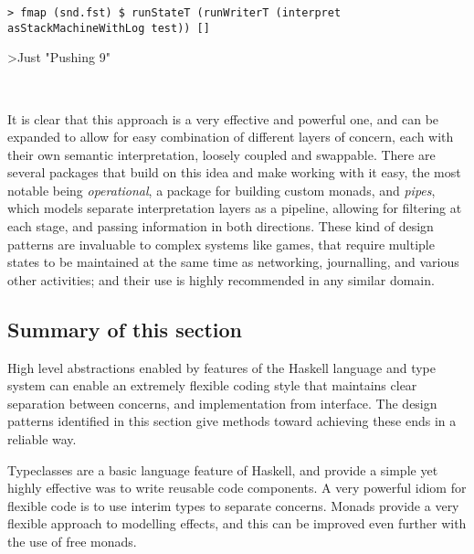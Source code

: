 \begin{verbatim}
> fmap (snd.fst) $ runStateT (runWriterT (interpret asStackMachineWithLog test)) []
\end{verbatim}\vspace{-1em}
>Just "Pushing 9\nMultiplying\nDuplicating\nMultiplying{}\nSubtracting\n"

\ 

\noindent
It is clear that this approach is a very effective and powerful one, and can be expanded to allow for easy combination of different layers of concern, each with their own semantic interpretation, loosely coupled and swappable. There are several packages that build on this idea and make working with it easy, the most notable being \emph{operational}, a package for building custom monads, and \emph{pipes}, which models separate interpretation layers as a pipeline, allowing for filtering at each stage, and passing information in both directions. These kind of design patterns are invaluable to complex systems like games, that require multiple states to be maintained at the same time as networking, journalling, and various other activities; and their use is highly recommended in any similar domain.

\subsection{Summary of this section} 

High level abstractions enabled by features of the Haskell language and type system can enable an extremely flexible coding style that maintains clear separation between concerns, and implementation from interface. The design patterns identified in this section give methods toward achieving these ends in a reliable way.

Typeclasses are a basic language feature of Haskell, and provide a simple yet highly effective was to write reusable code components. A very powerful idiom for flexible code is to use interim types to separate concerns. Monads provide a very flexible approach to modelling effects, and this can be improved even further with the use of free monads.

